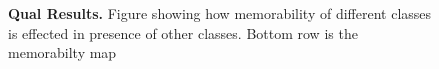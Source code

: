 \begin{figure}[t]
\vspace{-5mm}\caption{\footnotesize\textbf{Qual Results.} Figure showing how memorability of different classes is effected in presence of other classes. Bottom row is the memorabilty map}\label{fig:qualInterClass}
\end{figure}

